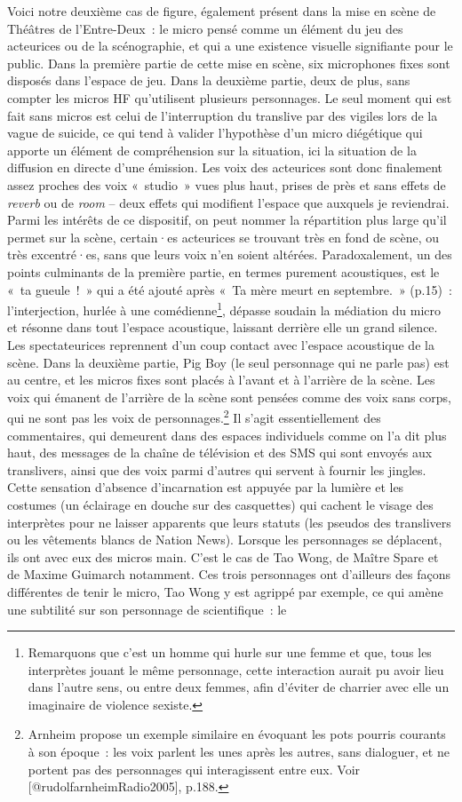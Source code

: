 \documentclass[
]{article}
\begin{document}
Voici notre deuxième cas de figure, également présent dans la mise en scène de Théâtres de l'Entre-Deux~: le micro pensé comme un élément du jeu des acteurices ou de la scénographie, et qui a une existence visuelle signifiante pour le public. Dans la première partie de cette mise en scène, six microphones fixes sont disposés dans l'espace de jeu. Dans la deuxième partie, deux de plus, sans compter les micros HF qu'utilisent plusieurs personnages. Le seul moment qui est fait sans micros est celui de l'interruption du translive par des vigiles lors de la vague de suicide, ce qui tend à valider l'hypothèse d'un micro diégétique qui apporte un élément de compréhension sur la situation, ici la situation de la diffusion en directe d'une émission. Les voix des acteurices sont donc finalement assez proches des voix «~studio~» vues plus haut, prises de près et sans effets de \emph{reverb} ou de \emph{room} -- deux effets qui modifient l'espace que auxquels je reviendrai. Parmi les intérêts de ce dispositif, on peut nommer la répartition plus large qu'il permet sur la scène, certain·es acteurices se trouvant très en fond de scène, ou très excentré·es, sans que leurs voix n'en soient altérées. Paradoxalement, un des points culminants de la première partie, en termes purement acoustiques, est le «~ta gueule~!~» qui a été ajouté après «~Ta mère meurt en septembre.~» (p.15)~: l'interjection, hurlée à une comédienne\footnote{Remarquons que c'est un homme qui hurle sur une femme et que, tous les interprètes jouant le même personnage, cette interaction aurait pu avoir lieu dans l'autre sens, ou entre deux femmes, afin d'éviter de charrier avec elle un imaginaire de violence sexiste.}, dépasse soudain la médiation du micro et résonne dans tout l'espace acoustique, laissant derrière elle un grand silence. Les spectateurices reprennent d'un coup contact avec l'espace acoustique de la scène. Dans la deuxième partie, Pig Boy (le seul personnage qui ne parle pas) est au centre, et les micros fixes sont placés à l'avant et à l'arrière de la scène. Les voix qui émanent de l'arrière de la scène sont pensées comme des voix sans corps, qui ne sont pas les voix de personnages.\footnote{Arnheim propose un exemple similaire en évoquant les pots pourris courants à son époque~: les voix parlent les unes après les autres, sans dialoguer, et ne portent pas des personnages qui interagissent entre eux. Voir {[}@rudolfarnheimRadio2005{]}, p.188.} Il s'agit essentiellement des commentaires, qui demeurent dans des espaces individuels comme on l'a dit plus haut, des messages de la chaîne de télévision et des SMS qui sont envoyés aux translivers, ainsi que des voix parmi d'autres qui servent à fournir les jingles. Cette sensation d'absence d'incarnation est appuyée par la lumière et les costumes (un éclairage en douche sur des casquettes) qui cachent le visage des interprètes pour ne laisser apparents que leurs statuts (les pseudos des translivers ou les vêtements blancs de Nation News). Lorsque les personnages se déplacent, ils ont avec eux des micros main. C'est le cas de Tao Wong, de Maître Spare et de Maxime Guimarch notamment. Ces trois personnages ont d'ailleurs des façons différentes de tenir le micro, Tao Wong y est agrippé par exemple, ce qui amène une subtilité sur son personnage de scientifique~: le 
\end{document}
